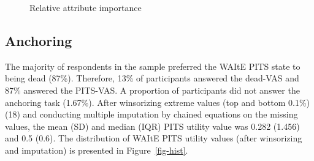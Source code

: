 \documentclass[
  letterpaper,
  DIV=11,
  numbers=noendperiod]{scrartcl}
\begin{document}
\begin{figure}


\caption{\label{fig-rai}Relative attribute importance}

\end{figure}%

\subsection{Anchoring}\label{anchoring}

The majority of respondents in the sample preferred the WAItE PITS state
to being dead (87\%). Therefore, 13\% of participants answered the
dead-VAS and 87\% answered the PITS-VAS. A proportion of participants
did not answer the anchoring task (1.67\%). After winsorizing extreme
values (top and bottom 0.1\%) (18) and conducting multiple imputation by
chained equations on the missing values, the mean (SD) and median (IQR)
PITS utility value was 0.282 (1.456) and 0.5 (0.6). The distribution of
WAItE PITS utility values (after winsorizing and imputation) is
presented in Figure~\ref{fig-hist}.
\end{document}
